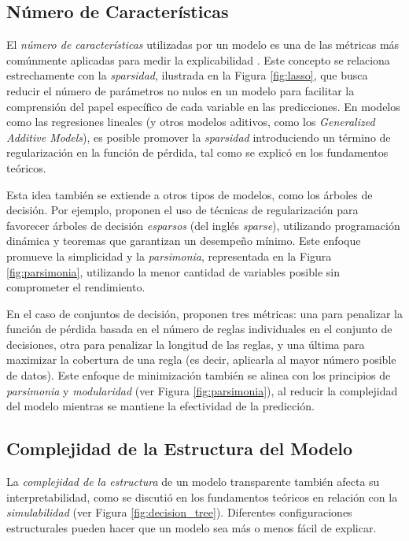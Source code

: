 \subsection{Número de Características}

El \textit{número de características} utilizadas por un modelo es una de las métricas más comúnmente aplicadas para medir la explicabilidad \cite{Lin-2020, lakkaraju-2016, Poursabzi-2021}. Este concepto se relaciona estrechamente con la \textit{sparsidad}, ilustrada en la Figura \ref{fig:lasso}, que busca reducir el número de parámetros no nulos en un modelo para facilitar la comprensión del papel específico de cada variable en las predicciones. En modelos como las regresiones lineales (y otros modelos aditivos, como los \textit{Generalized Additive Models}), es posible promover la \textit{sparsidad} introduciendo un término de regularización en la función de pérdida, tal como se explicó en los fundamentos teóricos.

Esta idea también se extiende a otros tipos de modelos, como los árboles de decisión. Por ejemplo, \cite{Hu-2019, Lin-2020} proponen el uso de técnicas de regularización para favorecer árboles de decisión \textit{esparsos} (del inglés \textit{sparse}), utilizando programación dinámica y teoremas que garantizan un desempeño mínimo. Este enfoque promueve la simplicidad y la \textit{parsimonia}, representada en la Figura \ref{fig:parsimonia}, utilizando la menor cantidad de variables posible sin comprometer el rendimiento.

En el caso de conjuntos de decisión, \cite{lakkaraju-2016} proponen tres métricas: una para penalizar la función de pérdida basada en el número de reglas individuales en el conjunto de decisiones, otra para penalizar la longitud de las reglas, y una última para maximizar la cobertura de una regla (es decir, aplicarla al mayor número posible de datos). Este enfoque de minimización también se alinea con los principios de \textit{parsimonia} y \textit{modularidad} (ver Figura \ref{fig:parsimonia}), al reducir la complejidad del modelo mientras se mantiene la efectividad de la predicción.

\subsection{Complejidad de la Estructura del Modelo}

La \textit{complejidad de la estructura} de un modelo transparente también afecta su interpretabilidad, como se discutió en los fundamentos teóricos en relación con la \textit{simulabilidad} (ver Figura \ref{fig:decision_tree}). Diferentes configuraciones estructurales pueden hacer que un modelo sea más o menos fácil de explicar.

